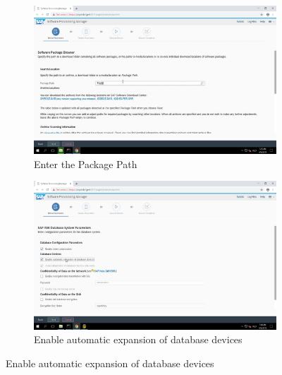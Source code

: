 \begin{figure}[!htb]\ContinuedFloat
    \begin{subfigure}{0.5\textwidth}
        \captionsetup{width=0.8\linewidth}
        \includegraphics[width=0.9\linewidth]{img/Methodologie/SAP26.png}
        \centering
        \caption{Enter the Package Path}
    \end{subfigure}
    \begin{subfigure}{0.5\textwidth}
        \captionsetup{width=0.8\linewidth}
        \includegraphics[width=0.9\linewidth]{img/Methodologie/SAP22.png}
        \centering
        \caption{Enable automatic expansion of database devices}
\end{subfigure}
\end{figure}
